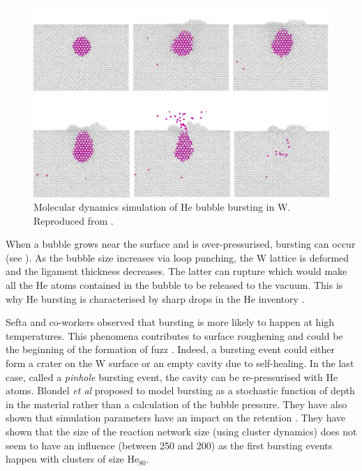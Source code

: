\begin{figure} [h!]
    \centering
    \includegraphics[width=\linewidth]{Figures/Chapter1/bubble_bursting_zhou.jpg}
    \caption{Molecular dynamics simulation of He bubble bursting in W. Reproduced from \cite{zhou_growth_2019}.}
\end{figure}

When a bubble grows near the surface and is over-pressurised, \gls{bursting} can occur (see ).
As the bubble size increases via \gls{loop punching}, the W \gls{lattice} is deformed and the ligament thickness decreases.
The latter can rupture which would make all the He atoms contained in the bubble to be released to the vacuum.
This is why He \gls{bursting} is characterised by sharp drops in the He \gls{inventory} .

Sefta and co-workers observed that \gls{bursting} is more likely to happen at high temperatures.
This phenomena contributes to surface roughening and could be the beginning of the formation of \gls{fuzz} .
Indeed, a \gls{bursting} event could either form a crater on the W surface or an empty cavity due to self-healing.
In the last case, called a \textit{pinhole} \gls{bursting} event, the cavity can be re-pressurised with He atoms.
Blondel \textit{et al} proposed to model \gls{bursting} as a stochastic function of depth in the material rather than a calculation of the bubble pressure.
They have also shown that simulation parameters have an impact on the \gls{retention} .
They have shown that the size of the reaction network size (using cluster dynamics) does not seem to have an influence (between 250 and 200) as the first bursting events happen with clusters of size $\text{He}_{80}$.

